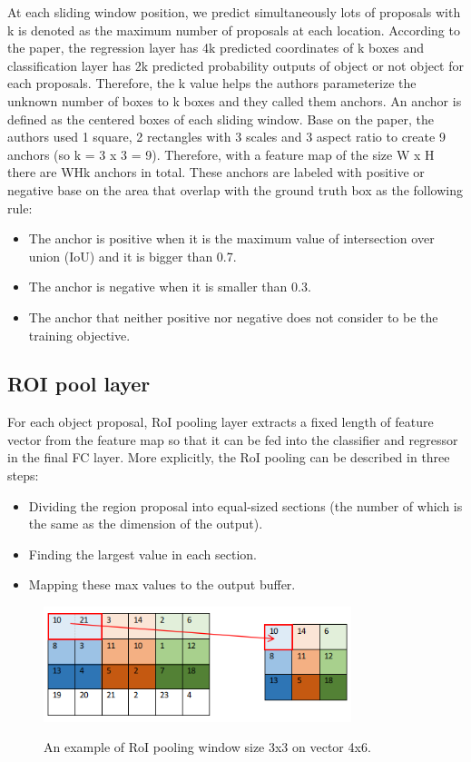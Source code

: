 	At each sliding window position, we predict simultaneously lots of proposals with k is denoted as the maximum number of proposals at each location. According to the paper, the regression layer has 4k predicted coordinates of k boxes and classification layer has 2k predicted probability outputs of object or not object for each proposals. Therefore, the k value helps the authors parameterize the unknown number of boxes to k boxes and they called them anchors. 
	An anchor is defined as the centered boxes of each sliding window. Base on the paper, the authors used 1 square, 2 rectangles with 3 scales and 3 aspect ratio to create 9 anchors (so k = 3 x 3 = 9). Therefore, with a feature map of the size W x H there are WHk anchors in total. These anchors are labeled with positive or negative base on the area that overlap with the ground truth box as the following rule:
	\begin{itemize}
		\item The anchor is positive when it is the maximum value of intersection over union (IoU) and it is bigger than 0.7.
		\item The anchor is negative when it is smaller than 0.3.
		\item The anchor that neither positive nor negative does not consider to be the training objective.
	\end{itemize}
	
\subsection{ROI pool layer}
\label{subsection:roi_pool}
\noindent	
	
	For each object proposal, RoI pooling layer extracts a fixed length of feature vector from the feature map so that it can be fed into the classifier and regressor in the final FC layer. More explicitly, the RoI pooling can be described in three steps:
	\begin{itemize}
		\item Dividing the region proposal into equal-sized sections (the number of which is the same as the dimension of the output).
		\item Finding the largest value in each section.
		\item Mapping these max values to the output buffer.
	\end{itemize}
	
	\begin{figure}[H]
		\centering
		{\includegraphics[width=0.8\textwidth]{./hinhanh/chap4/roi_quantization.png}}
		\caption{An example of RoI pooling window size 3x3 on vector 4x6.}
		\label{fig:roi_quantization}
	\end{figure}
	
